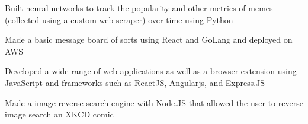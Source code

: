 

\begin{cvhonors}

  \cventry
    {} %
    {} %
    {} %
    {} %
    {
      \vspace{-5pt}
      \begin{cvitems} %
        \item {Built neural networks to track the popularity and other metrics of memes (collected using a custom web scraper) over time using Python}
        \item {Made a basic message board of sorts using React and GoLang and deployed on AWS }
        \item {Developed a wide range of web applications as well as  a browser extension using JavaScript and frameworks such as ReactJS, Angularjs, and Express.JS}
        \item {Made a image reverse search engine with Node.JS that allowed the user to reverse image search an XKCD comic}
      \end{cvitems}
    }

\end{cvhonors}
